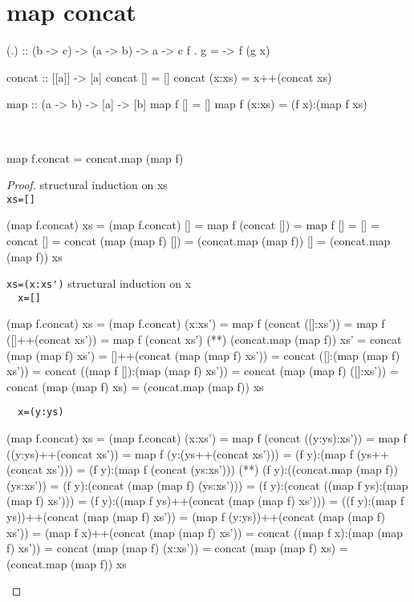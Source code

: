 \section{map concat}
\begin{code}
(.) :: (b -> c) -> (a -> b) -> a -> c
f . g = \x -> f (g x)
\end{code}
\begin{code}
concat :: [[a]] -> [a]
concat []     = []
concat (x:xs) = x++(concat xs)
\end{code}
\begin{code}
map :: (a -> b) -> [a] -> [b] 
map f []     = []
map f (x:xs) = (f x):(map f xs)
\end{code}
\begin{claim}\ 
\begin{code}
map f.concat = concat.map (map f)
\end{code}
\end{claim}
\begin{proof}structural induction on xs\\
\verb|xs=[]|
\begin{code}
(map f.concat) xs = (map f.concat) []
                  = map f (concat [])
                  = map f []
                  = []
                  = concat []
                  = concat (map (map f) [])
                  = (concat.map (map f)) []
                  = (concat.map (map f)) xs
\end{code}
\verb|xs=(x:xs')|
structural induction on x\\
\verb|  x=[]|
\begin{code}
(map f.concat) xs = (map f.concat) (x:xs')
                  = map f (concat ([]:xs'))
                  = map f ([]++(concat xs'))
                  = map f (concat xs')
                  (**) (concat.map (map f)) xs'
                  = concat (map (map f) xs')
                  = []++(concat (map (map f) xs'))
                  = concat ([]:(map (map f) xs'))
                  = concat ((map f []):(map (map f) xs'))
                  = concat (map (map f) ([]:xs'))
                  = concat (map (map f) xs)
                  = (concat.map (map f)) xs
\end{code}
\verb|  x=(y:ys)|
\begin{code}
(map f.concat) xs = (map f.concat) (x:xs')
                  = map f (concat ((y:ys):xs'))
                  = map f ((y:ys)++(concat xs'))
                  = map f (y:(ys++(concat xs')))
                  = (f y):(map f (ys++(concat xs')))
                  = (f y):(map f (concat (ys:xs')))
                  (**) (f y):((concat.map (map f)) (ys:xs'))
                  = (f y):(concat (map (map f) (ys:xs')))
                  = (f y):(concat ((map f ys):(map (map f) xs')))
                  = (f y):((map f ys)++(concat (map (map f) xs')))
                  = ((f y):(map f ys))++(concat (map (map f) xs'))
                  = (map f (y:ys))++(concat (map (map f) xs'))
                  = (map f x)++(concat (map (map f) xs'))
                  = concat ((map f x):(map (map f) xs'))
                  = concat (map (map f) (x:xs'))
                  = concat (map (map f) xs)
                  = (concat.map (map f)) xs
\end{code}
\end{proof}
